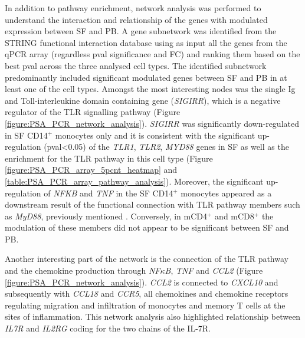 In addition to pathway enrichment, network analysis was performed to understand the interaction and relationship of the genes with modulated expression between SF and PB. A gene subnetwork was identified from the STRING functional interaction database using as input all the genes from the qPCR array (regardless pval significance and FC) and ranking them based on the best pval across the three analysed cell types. The identified subnetwork predominantly included significant modulated genes between SF and PB in at least one of the cell types. Amongst the most interesting nodes was the single Ig and Toll-interleukine domain containing gene (\textit{SIGIRR}), which is a negative regulator of the TLR signalling pathway (Figure \ref{figure:PSA_PCR_network_analysis}). \textit{SIGIRR} was significantly down-regulated in SF CD14$^+$ monocytes only and it is consistent with the significant up-regulation (pval<0.05) of the \textit{TLR1}, \textit{TLR2}, \textit{MYD88} genes in SF as well as the enrichment for the TLR pathway in this cell type (Figure \ref{figure:PSA_PCR_array_5pcnt_heatmap} and \ref{table:PSA_PCR_array_pathway_analysis}). Moreover, the significant up-regulation of \textit{NFKB} and \textit{TNF} in the SF CD14$^+$ monocytes appeared as a downstream result of the functional connection with TLR pathway members such as \textit{MyD88}, previously mentioned . Conversely, in mCD4$^+$ and mCD8$^+$ the modulation of these members did not appear to be significant between SF and PB.%

Another interesting part of the network is the connection of the TLR pathway and the chemokine production through \textit{NF$\kappa$B}, \textit{TNF} and \textit{CCL2} (Figure \ref{figure:PSA_PCR_network_analysis}). \textit{CCL2} is connected to \textit{CXCL10} and subsequently with \textit{CCL18} and \textit{CCR5}, all chemokines and chemokine receptors regulating migration and infiltration of monocytes and memory T cells at the sites of inflammation. This network analysis also highlighted relationship between \textit{IL7R} and \textit{IL2RG} coding for the two chains of the IL-7R. %


